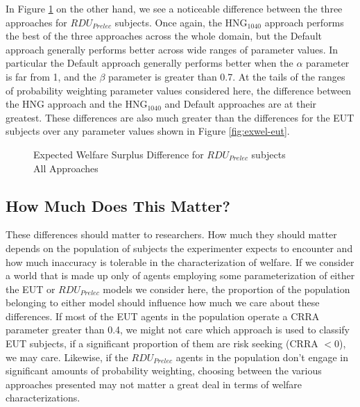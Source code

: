 \documentclass[../main.tex]{subfiles}
\begin{document}
In Figure \ref{fig:exwel-pre} on the other hand, we see a noticeable difference between the three approaches for $\mathit{RDU_{Prelec}}$ subjects.
Once again, the $\text{HNG}_{1040}$ approach performs the best of the three approaches across the whole domain, but the Default approach generally performs better across wide ranges of parameter values.
In particular the Default approach generally performs better when the $\alpha$ parameter is far from 1, and the $\beta$ parameter is greater than 0.7.
At the tails of the ranges of probability weighting parameter values considered here, the difference between the HNG approach and the $\text{HNG}_{1040}$ and Default approaches are at their greatest.
These differences are also much greater than the differences for the EUT subjects over any parameter values shown in Figure  \ref{fig:exwel-eut}.

\begin{figure}[h!]
	\center
	\caption{Expected Welfare Surplus Difference for $\mathit{RDU_{Prelec}}$ subjects\\All Approaches}
	\label{fig:exwel-pre}
\end{figure}

\subsection{How Much Does This Matter?}

These differences should matter to researchers.
How much they should matter depends on the population of subjects the experimenter expects to encounter and how much inaccuracy is tolerable in the characterization of welfare.
If we consider a world that is made up only of agents employing some parameterization of either the EUT or $\mathit{RDU_{Prelec}}$ models we consider here, the proportion of the population belonging to either model should influence how much we care about these differences.
If most of the EUT agents in the population operate a CRRA parameter greater than 0.4, we might not care which approach is used to classify EUT subjects, if a significant proportion of them are risk seeking (CRRA $< 0$), we may care.
Likewise, if the $\mathit{RDU_{Prelec}}$ agents in the population don't engage in significant amounts of probability weighting, choosing between the various approaches presented may not matter a great deal in terms of welfare characterizations.
\end{document}

